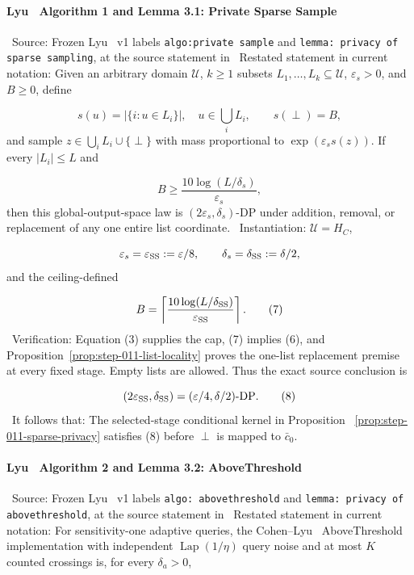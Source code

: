\paragraph{Lyu~\citep{lyu2025} Algorithm 1 and Lemma 3.1: Private Sparse Sample}

\noindent\textbullet\ Source: Frozen Lyu~\citep{lyu2025} v1 labels \texttt{algo:private sample} and
  \texttt{lemma: privacy of sparse sampling}, at the source statement in
\noindent\textbullet\ Restated statement in current notation: Given an arbitrary domain
  \(\mathcal U\), \(k\geq1\) subsets
  \(L_1,\ldots,L_k\subseteq\mathcal U\), \(\varepsilon_s>0\), and \(B\geq0\),
  define

  \[
    s(u)=|\{i:u\in L_i\}|,
    \quad u\in\bigcup_iL_i,
    \qquad s(\perp)=B,
  \]
  and sample \(z\in\bigcup_iL_i\cup\{\perp\}\) with mass proportional to
  \(\exp(\varepsilon_s s(z))\). If every \(|L_i|\leq L\) and

  \[
    B\geq\frac{10\log(L/\delta_s)}{\varepsilon_s},
    \tag{6}
  \]
  then this global-output-space law is
  \((2\varepsilon_s,\delta_s)\)-DP under addition, removal, or replacement
  of any one entire list coordinate.
\noindent\textbullet\ Instantiation: \(\mathcal U=H_C\),

  \[
    \varepsilon_s=\varepsilon_{\rm SS}:=\varepsilon/8,
    \qquad \delta_s=\delta_{\rm SS}:=\delta/2,
  \]
  and the  ceiling-defined

  \[
    B=\left\lceil
       \frac{10\log(L/\delta_{\rm SS})}
            {\varepsilon_{\rm SS}}
      \right\rceil.
    \tag{7}
  \]
\noindent\textbullet\ Verification: Equation (3) supplies the cap, (7) implies (6), and
  Proposition~\ref{prop:step-011-list-locality} proves the one-list
  replacement premise at every fixed stage. Empty lists are allowed. Thus
  the exact source conclusion is

  \[
    (2\varepsilon_{\rm SS},\delta_{\rm SS})
    =(\varepsilon/4,\delta/2)\text{-DP}.
    \tag{8}
  \]
\noindent\textbullet\ It follows that: The selected-stage conditional kernel in Proposition
  ~\ref{prop:step-011-sparse-privacy} satisfies (8) before \(\perp\) is
  mapped to \(\bar c_0\).

\paragraph{Lyu~\citep{lyu2025} Algorithm 2 and Lemma 3.2: AboveThreshold}

\noindent\textbullet\ Source: Frozen Lyu~\citep{lyu2025} v1 labels \texttt{algo: abovethreshold} and
  \texttt{lemma: privacy of abovethreshold}, at the source statement in
\noindent\textbullet\ Restated statement in current notation: For sensitivity-one adaptive
  queries, the Cohen--Lyu~\citep{lyu2025} AboveThreshold implementation with independent
  \(\operatorname{Lap}(1/\eta)\) query noise and at most \(K\) counted
  crossings is, for every \(\delta_a>0\),

